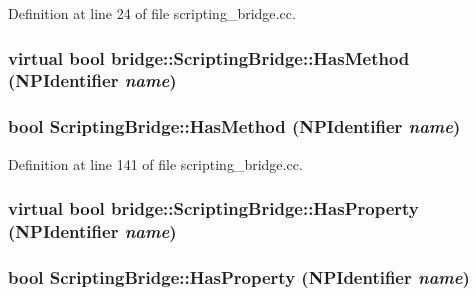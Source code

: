 Definition at line 24 of file scripting\_\-bridge.cc.

\hypertarget{classbridge_1_1_scripting_bridge_af968e6487c5cc9e2566118634c0ab561}{
\subsubsection[{HasMethod}]{\setlength{\rightskip}{0pt plus 5cm}virtual bool bridge::ScriptingBridge::HasMethod (NPIdentifier {\em name})}}
\label{classbridge_1_1_scripting_bridge_af968e6487c5cc9e2566118634c0ab561}
\hypertarget{classbridge_1_1_scripting_bridge_a1d614bb3696baef7c46332426ab7a0dc}{
\subsubsection[{HasMethod}]{\setlength{\rightskip}{0pt plus 5cm}bool ScriptingBridge::HasMethod (NPIdentifier {\em name})}}
\label{classbridge_1_1_scripting_bridge_a1d614bb3696baef7c46332426ab7a0dc}


Definition at line 141 of file scripting\_\-bridge.cc.

\hypertarget{classbridge_1_1_scripting_bridge_ad2cb9f2b860ba05a86c10f0824699e33}{
\subsubsection[{HasProperty}]{\setlength{\rightskip}{0pt plus 5cm}virtual bool bridge::ScriptingBridge::HasProperty (NPIdentifier {\em name})}}
\label{classbridge_1_1_scripting_bridge_ad2cb9f2b860ba05a86c10f0824699e33}
\hypertarget{classbridge_1_1_scripting_bridge_aeed261c756896802f26632acfceba1d7}{
\subsubsection[{HasProperty}]{\setlength{\rightskip}{0pt plus 5cm}bool ScriptingBridge::HasProperty (NPIdentifier {\em name})}}
\label{classbridge_1_1_scripting_bridge_aeed261c756896802f26632acfceba1d7}


